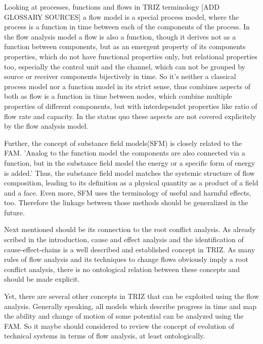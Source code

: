 \documentclass[a4paper,11pt]{article}
\begin{document}
        Looking at processes, functions and flows in TRIZ terminology [ADD GLOSSARY SOURCES]\cite{WebinarNotes} a flow model is a special process model, where the process is a
        function in time between each of the components of the process. \cite{SysInno2017} In the flow analysis model a flow is also a function, though it derives not
        as a function between components, but as an emergent property of its components properties, which do not have functional properties only, but relational
        properties too, especially the control unit and the channel, which can not be grouped by source or receiver components bijectively in time. 
        So it's neither a classical process model nor a function model in its strict sense, thus combines aspects of both as flow is a function in time between nodes, 
        which combine multiple properties of different components, but with interdependet properties like ratio of flow rate and capacity. In the status
        quo these aspects are not covered explicitely by the flow analysis model.

        Further, the concept of substance field models(SFM) is closely related to the FAM. 'Analog to the function model the components are also connected
        via a function, but in the substance field model the energy or a specific form of energy is added.' \cite{SysInno2017} Thus, the substance field model
        matches the systemic structure of flow composition, leading to its definition as a physical quantity as a product of a field and a face. \cite{Fluss-Physik}
        Even more, SFM uses the terminology of useful and harmful effects, too. \cite{SysInno2017} Therefore the linkage between those methods should be generalized in the
        future.

        Next mentioned should be its connection to the root conflict analysis. As already scribed in the introduction, cause and effect analysis and the
        identification of cause-effect-chains is a well described and established concept in TRIZ. As many rules of flow analysis and its techniques to
        change flows obviously imply a root conflict analysis, there is no ontological relation between these concepts and should be made explicit. 
        
        Yet, there are several other concepts in TRIZ that can be exploited using the flow analysis. Generally speaking, all models which describe 
        progress in time and map the ability and change of motion of some potential can be analyzed using the FAM. So it maybe should considered to
        review the concept of evolution of technical systems in terms of flow analysis, at least ontologically.
        
\end{document}
